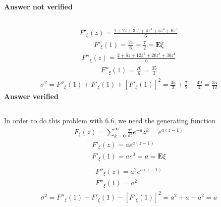 \textbf{Answer not verified}

\subsection{}
\begin{eqnarray}
	F'_{\xi}(z) = \frac{1+ 2z + 3z^2 + 4z^3 + 5z^4 + 6z^5}{6}
\end{eqnarray}
\begin{eqnarray}
	F'_{\xi}(1) = \frac{21}{6} = \frac{7}{2} = \textbf{E}\xi
\end{eqnarray}
\begin{eqnarray}
	F''_{\xi}(z) = \frac{2+ 6z + 12z^2 + 20z^3 + 30z^4 }{6}
\end{eqnarray}
\begin{eqnarray}
	F''_{\xi}(1) = \frac{70}{6} = \frac{35}{3}  
\end{eqnarray}
\begin{eqnarray}
	\sigma^2 = F''_{\xi}(1) + F'_{\xi}(1) + [F'_{\xi}(1)]^2  = \frac{35}{3} + \frac{7}{2} - \frac{49}{4}  = \frac{35}{12}
\end{eqnarray}
\textbf{Answer verified}

\subsection{}
In order to do this problem with 6.6, we need the generating function
\begin{eqnarray}
	F_{\xi}(z) = \sum_{k=0}^{\infty} \frac{ a^k }{k!}e^{-a} z^k = e^{a(z-1)}
\end{eqnarray}
\begin{eqnarray}
	F'_{\xi}(z) = a e^{a (z-1)} \\
	F'_{\xi}(1) = a e^{0}  = a = \textbf{E}\xi\\
\end{eqnarray}
\begin{eqnarray}
	F''_{\xi}(z) = a^2 e^{a (z-1)} \\
	F''_{\xi}(1) = a^2
\end{eqnarray}
\begin{eqnarray}
	\sigma^2 = F''_{\xi}(1) + F'_{\xi}(1) - [F'_{\xi}(1)]^2  = a^2 + a - a^2 = a
\end{eqnarray}



